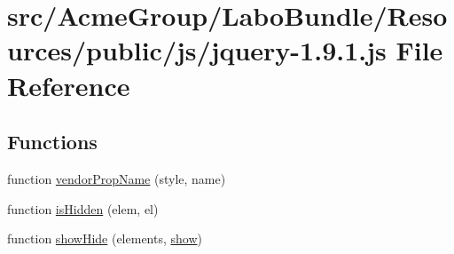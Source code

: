 \hypertarget{jquery-1_89_81_8js}{\section{src/\+Acme\+Group/\+Labo\+Bundle/\+Resources/public/js/jquery-\/1.9.1.js File Reference}
\label{jquery-1_89_81_8js}
}
\subsection*{Functions}
\begin{DoxyCompactItemize}
\item 
function \hyperlink{jquery-1_89_81_8js_a6a111234d6e26ce833f8fabd50819b7a}{vendor\+Prop\+Name} (style, name)
\item 
function \hyperlink{jquery-1_89_81_8js_a67ed58d688ff11991ca2826ebfbf28a4}{is\+Hidden} (elem, el)
\item 
function \hyperlink{jquery-1_89_81_8js_a002b8e481f3ab2a83194366aceb7a706}{show\+Hide} (elements, \hyperlink{jquery_8tooltip_8js_aa8d9f2083cafa2af98efafed94901079}{show})
\item 

\end{DoxyCompactItemize}
